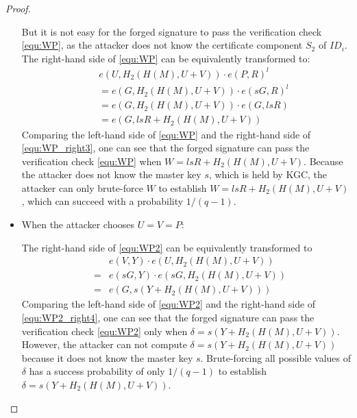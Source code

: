 \documentclass[letterpaper,12pt]{article}
\begin{document}
\begin{proof}
\begin{itemize}
But it is not easy for the forged signature to pass the verification check \eqref{equ:WP}, as the attacker does not know the certificate component $S_2$ of  $ID_i$. %
%
The right-hand side of \eqref{equ:WP} can be equivalently transformed to:
\begin{eqnarray} \label{equ:WP_right3}
&&e(U, H_2(H(M), U+V))\cdot e(P, R)^l \nonumber\\
&&=e(G, H_2(H(M),U+V))\cdot e(sG, R)^l \nonumber\\
&&=e(G, H_2(H(M),U+V)) \cdot e(G, lsR) \nonumber\\
&&=e(G, lsR+H_2(H(M),U+V))
\end{eqnarray}
Comparing the left-hand side of \eqref{equ:WP} and  the right-hand side of \eqref{equ:WP_right3}, one can see that the forged signature can pass the verification check \eqref{equ:WP} when $W=lsR+H_2(H(M),U+V)$. Because the attacker does not know the master key $s$, which is held by KGC, the attacker can only brute-force $W$ to establish $W=lsR+H_2(H(M),U+V)$, which can succeed with a probability $1/(q-1)$. %

\item When the attacker chooses $U=V=P$:

The right-hand side of \eqref{equ:WP2} can be equivalently transformed to
\begin{eqnarray} \label{equ:WP2_right4}
&&e(V, Y)\cdot e(U, H_2(H(M), U+V)) \nonumber\\
&=&e(sG, Y)\cdot e(sG, H_2(H(M),U+V)) \nonumber\\
&=&e(G, s(Y+H_2(H(M), U+V)))
\end{eqnarray}
Comparing the left-hand side of \eqref{equ:WP2} and the right-hand side of \eqref{equ:WP2_right4}, one can see that the forged signature can pass the verification check \eqref{equ:WP2} only when $\delta=s(Y+H_2(H(M), U+V))$. However, the attacker can not compute $\delta=s(Y+H_2(H(M), U+V))$ because it does not know the master key $s$. Brute-forcing all possible values of $\delta$ has a success probability of only $1/(q-1)$ to establish $\delta=s(Y+H_2(H(M), U+V))$.


\end{itemize}
\end{proof}
\end{document}
